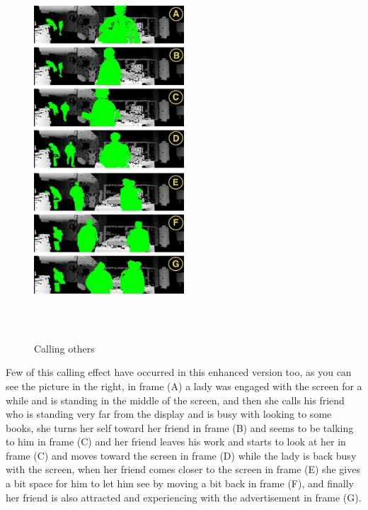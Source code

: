 \begin{figure}
  \vspace{-10pt}
  \begin{center}
    \includegraphics[width=0.50\textwidth,height=140mm]{Figures/9/effects/calling_others}
  \end{center}
  \vspace{-20pt}
  \caption{Calling others}
  \vspace{-20pt}
\end{figure}
Few of this calling effect have occurred in this enhanced version too, as you can see the picture in the right, in frame (A) a lady was engaged with the screen for a while and is standing in the middle of the screen, and then she calls his friend who is standing very far from the display and is busy with looking to some books, she turns her self toward her friend in frame (B) and seems to be talking to him in frame (C) and her friend leaves his work and starts to look at her in frame (C) and moves toward the screen in frame (D) while the lady is back busy with the screen, when her friend comes closer to the screen in frame (E) she gives a bit space for him to let him see by moving a bit back in frame (F), and finally her friend is also attracted and experiencing with the advertisement in frame (G).  
\break
\break
\break
\break
\break
\break
\break
\break



